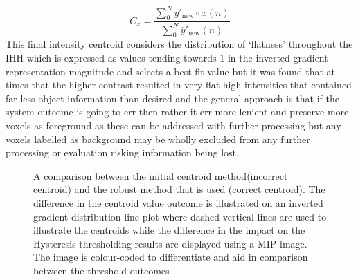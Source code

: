 \begin{equation}\label{eq:actual_centroid}
    C_x = \frac{\sum_{0}^{N} \overline{y}'_{\text{new}}\circ x(n)}{\sum_{0}^{N}\overline{y}'_{\text{new}}(n)}
\end{equation}
This final intensity centroid considers the distribution of `flatness' throughout the IHH which is expressed as values tending towards $1$ in the inverted gradient representation magnitude and selects a best-fit value but it was found that at times that the higher contrast resulted in very flat high intensities that contained far less object information than desired and the general approach is that if the system outcome is going to err then rather it err more lenient and preserve more voxels as foreground as these can be addressed with further processing but any voxels labelled as background may be wholly excluded from any further processing or evaluation risking information being lost.
\begin{figure}
    \centering
    \label{fig:centroid_illustration}
    \caption[A comparison between the initial centroid method(incorrect centroid) and the robust method that is used (correct centroid)]{A comparison between the initial centroid method(incorrect centroid) and the robust method that is used (correct centroid). The difference in the centroid value outcome is illustrated on an inverted gradient distribution line plot where dashed vertical lines are used to illustrate the centroids while the difference in the impact on the Hysteresis thresholding results are displayed using a MIP image. The image is colour-coded to differentiate and aid in comparison between the threshold outcomes}
\end{figure}
